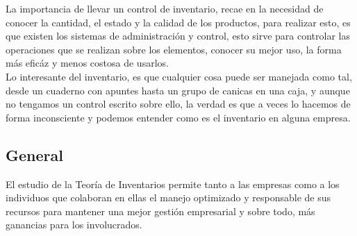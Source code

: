 \documentclass[letterpaper, 12pt]{article}
\begin{document}
    La importancia de llevar un control de inventario, recae en la necesidad de conocer la cantidad, el estado y la calidad de los productos, para realizar esto, es que existen los sistemas de administración y control, esto sirve para controlar las operaciones que se realizan sobre los elementos, conocer su mejor uso, la forma más eficáz y menos costosa de usarlos.
    \\\newline
    Lo interesante del inventario, es que cualquier cosa puede ser manejada como tal, desde un cuaderno con apuntes hasta un grupo de canicas en una caja, y aunque no tengamos un control escrito sobre ello, la verdad es que a veces lo hacemos de forma inconsciente y podemos entender como es el inventario en alguna empresa.
    \subsection*{General}
    \justify
    El estudio de la Teoría de Inventarios permite tanto a las empresas como a los individuos que colaboran en ellas el manejo optimizado y responsable de sus recursos para mantener una mejor gestión empresarial y sobre todo, más ganancias para los involucrados.
    \newpage
    \thispagestyle{fancy}
    \lhead{}
    \rhead{} 
\end{document}
